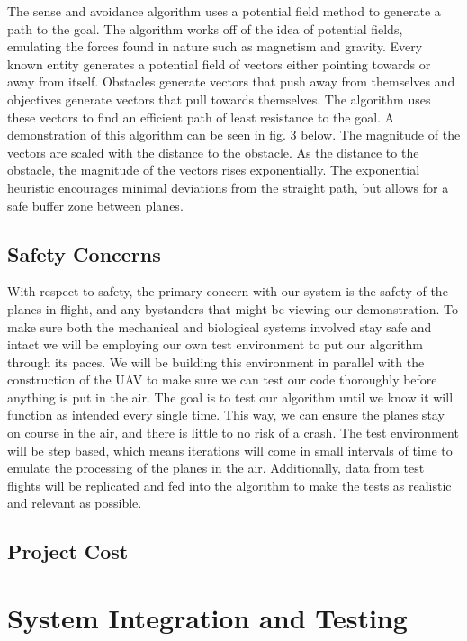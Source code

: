 \documentclass[12pt]{article}
\begin{document}
	The sense and avoidance algorithm uses a potential field method to generate a path to the goal. The algorithm works off of the idea of potential fields, emulating the forces found in nature such as magnetism and gravity. Every known entity generates a potential field of vectors either pointing towards or away from itself. Obstacles generate vectors that push away from themselves and objectives generate vectors that pull towards themselves. The algorithm uses these vectors to find an efficient path of least resistance to the goal. A demonstration of this algorithm can be seen in fig. 3 below. The magnitude of the vectors are scaled with the distance to the obstacle. As the distance to the obstacle, the magnitude of the vectors rises exponentially. The exponential heuristic encourages minimal deviations from the straight path, but allows for a safe buffer zone between planes.

\subsection{Safety Concerns}
	With respect to safety, the primary concern with our system is the safety of the planes in flight, and any bystanders that might be viewing our demonstration. To make sure both the mechanical and biological systems involved stay safe and intact we will be employing our own test environment to put our algorithm through its paces. We will be building this environment in parallel with the construction of the UAV to make sure we can test our code thoroughly before anything is put in the air. The goal is to test our algorithm until we know it will function as intended every single time. This way, we can ensure the planes stay on course in the air, and there is little to no risk of a crash. The test environment will be step based, which means iterations will come in small intervals of time to emulate the processing of the planes in the air. Additionally, data from test flights will be replicated and fed into the algorithm to make the tests as realistic and relevant as possible.

\subsection{Project Cost}

\section{System Integration and Testing}
\end{document}

